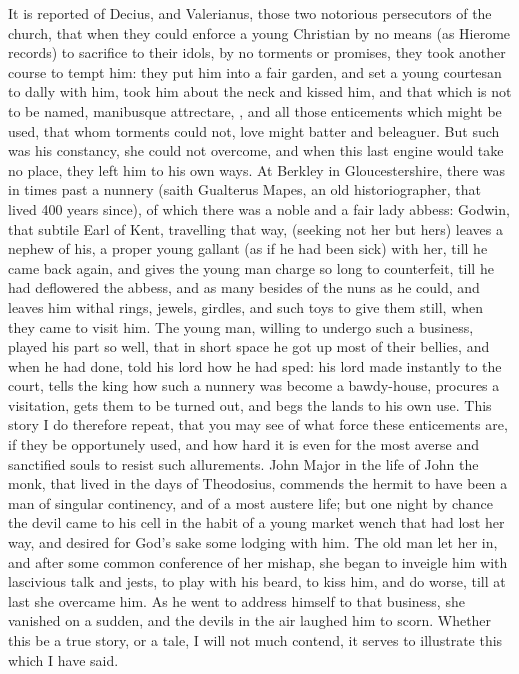 It is reported of Decius, and Valerianus, those two notorious
persecutors of the church, that when they could enforce a young
Christian by no means (as Hierome records) to sacrifice to their
idols, by no torments or promises, they took another course to tempt
him: they put him into a fair garden, and set a young courtesan to
dally with him, took him about the neck and kissed him, and that
which is not to be named, manibusque attrectare, \etc{}, and all those
enticements which might be used, that whom torments could not, love
might batter and beleaguer. But such was his constancy, she could not
overcome, and when this last engine would take no place, they left him
to his own ways. At Berkley in Gloucestershire, there was in
times past a nunnery (saith Gualterus Mapes, an old historiographer,
that lived 400 years since), of which there was a noble and a fair lady
abbess: Godwin, that subtile Earl of Kent, travelling that way,
(seeking not her but hers) leaves a nephew of his, a proper young
gallant (as if he had been sick) with her, till he came back again, and
gives the young man charge so long to counterfeit, till he had
deflowered the abbess, and as many besides of the nuns as he could, and
leaves him withal rings, jewels, girdles, and such toys to give them
still, when they came to visit him. The young man, willing to undergo
such a business, played his part so well, that in short space he got up
most of their bellies, and when he had done, told his lord how he had
sped: his lord made instantly to the court, tells the king how
such a nunnery was become a bawdy-house, procures a visitation, gets
them to be turned out, and begs the lands to his own use. This story I
do therefore repeat, that you may see of what force these enticements
are, if they be opportunely used, and how hard it is even for the most
averse and sanctified souls to resist such allurements. John Major in
the life of John the monk, that lived in the days of Theodosius,
commends the hermit to have been a man of singular continency, and of a
most austere life; but one night by chance the devil came to his cell
in the habit of a young market wench that had lost her way, and desired
for God's sake some lodging with him. The old man let her in, and
after some common conference of her mishap, she began to inveigle him
with lascivious talk and jests, to play with his beard, to kiss him,
and do worse, till at last she overcame him. As he went to address
himself to that business, she vanished on a sudden, and the devils in
the air laughed him to scorn. Whether this be a true story, or a tale,
I will not much contend, it serves to illustrate this which I have
said.

